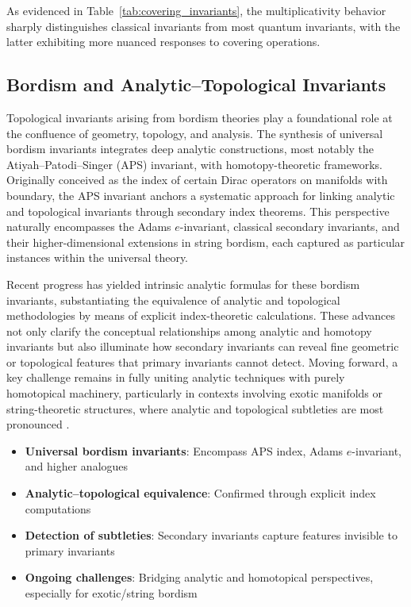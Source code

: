 \documentclass[sigconf]{acmart}
\begin{document}
As evidenced in Table~\ref{tab:covering_invariants}, the multiplicativity behavior sharply distinguishes classical invariants from most quantum invariants, with the latter exhibiting more nuanced responses to covering operations.

\subsection{Bordism and Analytic–Topological Invariants}

Topological invariants arising from bordism theories play a foundational role at the confluence of geometry, topology, and analysis. The synthesis of universal bordism invariants integrates deep analytic constructions, most notably the Atiyah–Patodi–Singer (APS) invariant, with homotopy-theoretic frameworks. Originally conceived as the index of certain Dirac operators on manifolds with boundary, the APS invariant anchors a systematic approach for linking analytic and topological invariants through secondary index theorems. This perspective naturally encompasses the Adams $e$-invariant, classical secondary invariants, and their higher-dimensional extensions in string bordism, each captured as particular instances within the universal theory.

Recent progress has yielded intrinsic analytic formulas for these bordism invariants, substantiating the equivalence of analytic and topological methodologies by means of explicit index-theoretic calculations. These advances not only clarify the conceptual relationships among analytic and homotopy invariants but also illuminate how secondary invariants can reveal fine geometric or topological features that primary invariants cannot detect. Moving forward, a key challenge remains in fully uniting analytic techniques with purely homotopical machinery, particularly in contexts involving exotic manifolds or string-theoretic structures, where analytic and topological subtleties are most pronounced \cite{ref82}.

\begin{itemize}
    \item \textbf{Universal bordism invariants}: Encompass APS index, Adams $e$-invariant, and higher analogues
    \item \textbf{Analytic–topological equivalence}: Confirmed through explicit index computations
    \item \textbf{Detection of subtleties}: Secondary invariants capture features invisible to primary invariants
    \item \textbf{Ongoing challenges}: Bridging analytic and homotopical perspectives, especially for exotic/string bordism
\end{itemize}
\end{document}
